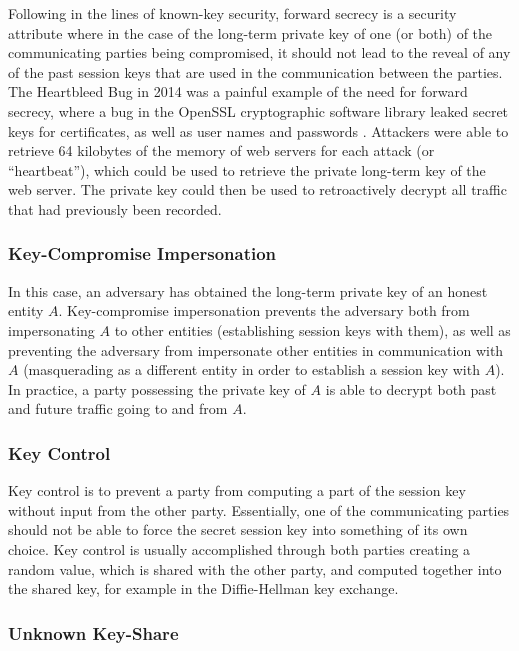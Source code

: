 Following in the lines of known-key security, forward secrecy is a security attribute where in the case of the long-term private key of one (or both) of the communicating parties being compromised, it should not lead to the reveal of any of the past session keys that are used in the communication between the parties. 
The Heartbleed Bug in 2014 was a painful example of the need for forward secrecy, where a bug in the OpenSSL cryptographic software library leaked secret keys for certificates, as well as user names and passwords \cite{durumeric2014matter}. Attackers were able to retrieve 64 kilobytes of the memory of web servers for each attack (or ``heartbeat''), which could be used to retrieve the private long-term key of the web server. The private key could then be used to retroactively decrypt all traffic that had previously been recorded.

\subsubsection{Key-Compromise Impersonation}

In this case, an adversary has obtained the long-term private key of an honest entity $A$. Key-compromise impersonation prevents the adversary both from impersonating $A$ to other entities (establishing session keys with them), as well as preventing the adversary from impersonate other entities in communication with $A$ (masquerading as a different entity in order to establish a session key with $A$). In practice, a party possessing the private key of $A$ is able to decrypt both past and future traffic going to and from $A$.


\subsubsection{Key Control}

Key control is to prevent a party from computing a part of the session key without input from the other party. Essentially, one of the communicating parties should not be able to force the secret session key into something of its own choice. Key control is usually accomplished through both parties creating a random value, which is shared with the other party, and computed together into the shared key, for example in the Diffie-Hellman key exchange.

\subsubsection{Unknown Key-Share}

